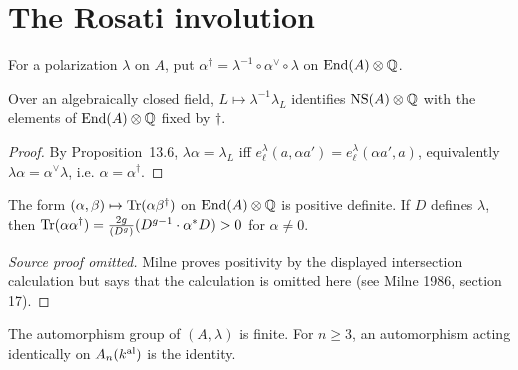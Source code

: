 \section{The Rosati involution}
\begin{definition}\label{def:milne-rosati-involution}
For a polarization $\lambda$ on $A$, put $\alpha^\dagger=\lambda^{-1}\circ\alpha^\vee\circ\lambda$ on $\operatorname{End}(A)\otimes\mathbb{Q}$.
\end{definition}
\begin{proposition}\label{prop:milne-rosati-ns}
Over an algebraically closed field, $L\mapsto\lambda^{-1}\lambda_L$ identifies $\operatorname{NS}(A)\otimes\mathbb{Q}$ with the elements of $\operatorname{End}(A)\otimes\mathbb{Q}$ fixed by $\dagger$.
\end{proposition}

\begin{proof}

By Proposition~13.6, $\lambda\alpha=\lambda_L$ iff $e_\ell^\lambda(a,\alpha a')=e_\ell^\lambda(\alpha a',a)$, equivalently $\lambda\alpha=\alpha^\vee\lambda$, i.e. $\alpha=\alpha^\dagger$.

\end{proof}

\begin{theorem}\label{thm:milne-rosati-positivity}
The form $(\alpha,\beta)\mapsto\operatorname{Tr}(\alpha\beta^\dagger)$ on $\operatorname{End}(A)\otimes\mathbb{Q}$ is positive definite. If $D$ defines $\lambda$, then $\operatorname{Tr}(\alpha\alpha^\dagger)=\frac{2g}{(D^g)}(D^{g-1}\cdot\alpha^*D)>0$ for $\alpha\ne0$.
\end{theorem}
\begin{proof}[Source proof omitted]
Milne proves positivity by the displayed intersection calculation but says that
the calculation is omitted here (see Milne 1986, section 17).
\end{proof}
\begin{proposition}\label{prop:milne-rosati-automorphisms}
The automorphism group of $(A,\lambda)$ is finite. For $n\ge3$, an automorphism acting identically on $A_n(k^{\rm al})$ is the identity.
\end{proposition}

